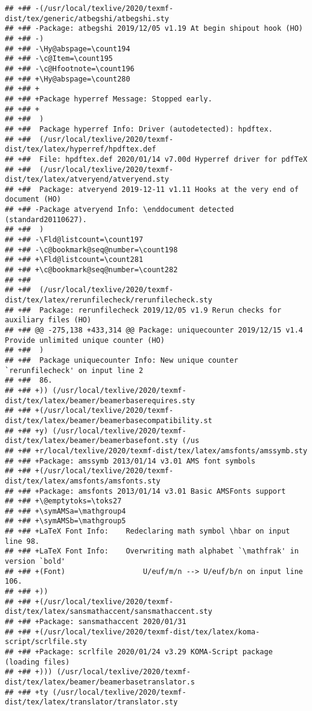 \documentclass[ignorenonframetext,]{beamer}
\begin{document}
\begin{verbatim}
## +## -(/usr/local/texlive/2020/texmf-dist/tex/generic/atbegshi/atbegshi.sty
## +## -Package: atbegshi 2019/12/05 v1.19 At begin shipout hook (HO)
## +## -)
## +## -\Hy@abspage=\count194
## +## -\c@Item=\count195
## +## -\c@Hfootnote=\count196
## +## +\Hy@abspage=\count280
## +## +
## +## +Package hyperref Message: Stopped early.
## +## +
## +##  )
## +##  Package hyperref Info: Driver (autodetected): hpdftex.
## +##  (/usr/local/texlive/2020/texmf-dist/tex/latex/hyperref/hpdftex.def
## +##  File: hpdftex.def 2020/01/14 v7.00d Hyperref driver for pdfTeX
## +##  (/usr/local/texlive/2020/texmf-dist/tex/latex/atveryend/atveryend.sty
## +##  Package: atveryend 2019-12-11 v1.11 Hooks at the very end of document (HO)
## +## -Package atveryend Info: \enddocument detected (standard20110627).
## +##  )
## +## -\Fld@listcount=\count197
## +## -\c@bookmark@seq@number=\count198
## +## +\Fld@listcount=\count281
## +## +\c@bookmark@seq@number=\count282
## +##  
## +##  (/usr/local/texlive/2020/texmf-dist/tex/latex/rerunfilecheck/rerunfilecheck.sty
## +##  Package: rerunfilecheck 2019/12/05 v1.9 Rerun checks for auxiliary files (HO)
## +## @@ -275,138 +433,314 @@ Package: uniquecounter 2019/12/15 v1.4 Provide unlimited unique counter (HO)
## +##  )
## +##  Package uniquecounter Info: New unique counter `rerunfilecheck' on input line 2
## +##  86.
## +## +)) (/usr/local/texlive/2020/texmf-dist/tex/latex/beamer/beamerbaserequires.sty
## +## +(/usr/local/texlive/2020/texmf-dist/tex/latex/beamer/beamerbasecompatibility.st
## +## +y) (/usr/local/texlive/2020/texmf-dist/tex/latex/beamer/beamerbasefont.sty (/us
## +## +r/local/texlive/2020/texmf-dist/tex/latex/amsfonts/amssymb.sty
## +## +Package: amssymb 2013/01/14 v3.01 AMS font symbols
## +## +(/usr/local/texlive/2020/texmf-dist/tex/latex/amsfonts/amsfonts.sty
## +## +Package: amsfonts 2013/01/14 v3.01 Basic AMSFonts support
## +## +\@emptytoks=\toks27
## +## +\symAMSa=\mathgroup4
## +## +\symAMSb=\mathgroup5
## +## +LaTeX Font Info:    Redeclaring math symbol \hbar on input line 98.
## +## +LaTeX Font Info:    Overwriting math alphabet `\mathfrak' in version `bold'
## +## +(Font)                  U/euf/m/n --> U/euf/b/n on input line 106.
## +## +))
## +## +(/usr/local/texlive/2020/texmf-dist/tex/latex/sansmathaccent/sansmathaccent.sty
## +## +Package: sansmathaccent 2020/01/31
## +## +(/usr/local/texlive/2020/texmf-dist/tex/latex/koma-script/scrlfile.sty
## +## +Package: scrlfile 2020/01/24 v3.29 KOMA-Script package (loading files)
## +## +))) (/usr/local/texlive/2020/texmf-dist/tex/latex/beamer/beamerbasetranslator.s
## +## +ty (/usr/local/texlive/2020/texmf-dist/tex/latex/translator/translator.sty

\end{verbatim}
\end{document}
